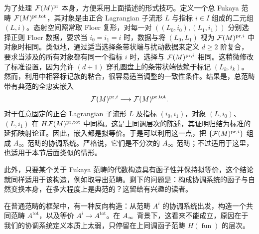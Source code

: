 为了处理 $\mathcal F(M)^{\mathrm{pr}}$ 本身，方便采用上面描述的形式技巧。定义一个总 Fukaya 范畴 $\mathcal F(M)^{\mathrm{pr},\mathrm{tot}}$，其对象是由正合 Lagrangian 子流形 $L$ 与指标 $i\in I$ 组成的二元组 $(L,i)$。态射空间照常取 Floer 复形，对每一对 $((L_0,i_0),(L_1,i_1))$ 分别选择正则 Floer 数据，要求当 $i_0=i_1=i$ 时，数据与将 $(L_0,L_1)$
视为 $\mathcal F(M)^{\mathrm{pr},i}$ 中对象时相同。类似地，通过适当选择条带状端与扰动数据来定义 $d\geq2$ 阶复合，要求当涉及的所有对象都有同一个指标 $i$ 时，选择与 $\mathcal F(M)^{\mathrm{pr},i}$ 相同。这稍微修改了标准设置，因为允许 $(d+1)$ 穿孔圆盘上的条带状端依赖于标记 $(L_k,i_k)$。然而，利用中相容标记族的粘合，很容易适当调整的一致性条件。结果是，总范畴带有典范的全忠实嵌入
\begin{equation}\label{eq:10.3}
\mathcal F(M)^{\mathrm{pr},i}\longrightarrow\mathcal F(M)^{\mathrm{pr},\mathrm{tot}}.
\end{equation}
对于任意固定的正合 Lagrangian 子流形 $L$ 及指标 $(i_0,i_1)$，对象 $(L,i_0)$、$(L,i_1)$ 在 $H\mathcal F(M)^{\mathrm{pr},\mathrm{tot}}$ 中同构。这是上同调层次的陈述，其证明归结为标准的延拓映射论证。因此，嵌入都是拟等价。于是可以利用这一点，把 $\{\mathcal F(M)^{\mathrm{pr},i}\}$ 组成 $A_\infty$ 范畴的协调系统。严格说，它们是不分次的 $A_\infty$ 范畴；不过适用于这里，也适用于本节后面类似的情形。

此外，只要某个关于 Fukaya 范畴的代数构造具有函子性并保持拟等价，这个结论就同样适用于该构造，例如取导出范畴。剩下的问题是：构成协调系统的函子与自然变换本身，在多大程度上是典范的？这留给有兴趣的读者。
\begin{note}\label{st:10.1}
在普通范畴的框架中，有一种反向构造：从范畴 $A^i$ 的协调系统出发，构造一个共同范畴 $A^{\mathrm{tot}}$，以及等价 $A^i\to A^{\mathrm{tot}}$。在 $A_\infty$ 背景下，这看来不能成立，原因在于我们的协调系统定义本质上太弱，只停留在上同调函子范畴 $H(\operatorname{fun})$ 的层次。
\end{note}

